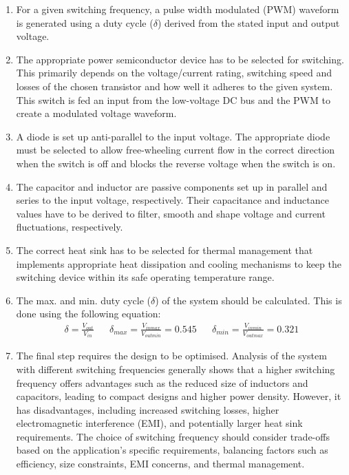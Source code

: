         \begin{enumerate}
            \item For a given switching frequency, a pulse width modulated (PWM) waveform is generated using a duty cycle (\(\delta\)) derived from the stated input and output voltage. 
            
            \item The appropriate power semiconductor device has to be selected for switching. This primarily depends on the voltage/current rating, switching speed and losses of the chosen transistor and how well it adheres to the given system. This switch is fed an input from the low-voltage DC bus and the PWM to create a modulated voltage waveform.

            \item A diode is set up anti-parallel to the input voltage. The appropriate diode must be selected to allow free-wheeling current flow in the correct direction when the switch is off and blocks the reverse voltage when the switch is on.

            \item The capacitor and inductor are passive components set up in parallel and series to the input voltage, respectively. Their capacitance and inductance values have to be derived to filter, smooth and shape voltage and current fluctuations, respectively.

            \item The correct heat sink has to be selected for thermal management that implements appropriate heat dissipation and cooling mechanisms to keep the switching device within its safe operating temperature range. 

            \item The max. and min. duty cycle (\(\delta\)) of the system should be calculated. This is done using the following equation:
            \begin{align}
                \delta = \frac{V_{out}}{V_{in}} && \delta_{max} = \frac{V_{inmax}}{V_{outmin}} = 0.545 && \delta_{min} = \frac{V_{inmin}}{V_{outmax}} = 0.321
            \end{align}

            \item The final step requires the design to be optimised. Analysis of the system with different switching frequencies generally shows that a higher switching frequency offers advantages such as the reduced size of inductors and capacitors, leading to compact designs and higher power density. However, it has disadvantages, including increased switching losses, higher electromagnetic interference (EMI), and potentially larger heat sink requirements. The choice of switching frequency should consider trade-offs based on the application's specific requirements, balancing factors such as efficiency, size constraints, EMI concerns, and thermal management.
        \end{enumerate}

